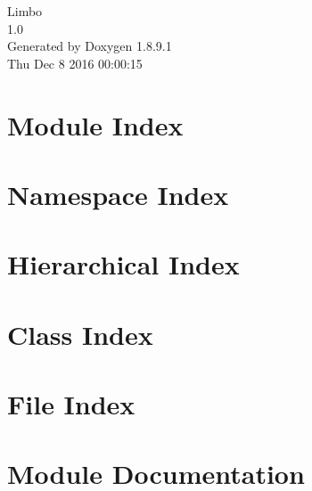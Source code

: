\documentclass[twoside]{book}
\newcommand{\+}{\discretionary{\mbox{\scriptsize$\hookleftarrow$}}{}{}}
\newcommand{\clearemptydoublepage}{%
  \newpage{\pagestyle{empty}\cleardoublepage}%
}
\begin{document}
\hypersetup{pageanchor=false,
             bookmarks=true,
             bookmarksnumbered=true,
             pdfencoding=unicode
            }
\begin{titlepage}
\vspace*{7cm}
\begin{center}%
{\Large Limbo \\[1ex]\large 1.\+0 }\\
\vspace*{1cm}
{\large Generated by Doxygen 1.8.9.1}\\
\vspace*{0.5cm}
{\small Thu Dec 8 2016 00:00:15}\\
\end{center}
\end{titlepage}
\clearemptydoublepage
\tableofcontents
\clearemptydoublepage
{}
\hypersetup{pageanchor=true}

\chapter{Module Index}

\chapter{Namespace Index}

\chapter{Hierarchical Index}

\chapter{Class Index}

\chapter{File Index}

\chapter{Module Documentation}



















\end{document}
